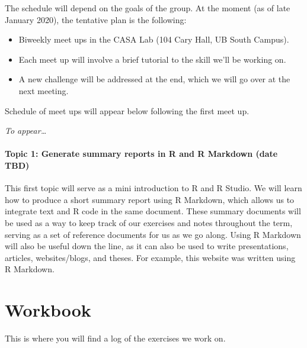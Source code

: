 \documentclass[
]{book}
\providecommand{\tightlist}{%
  \setlength{\itemsep}{0pt}\setlength{\parskip}{0pt}}
\begin{document}
The schedule will depend on the goals of the group. At the moment (as of late January 2020), the tentative plan is the following:

\begin{itemize}
\tightlist
\item
  Biweekly meet ups in the CASA Lab (104 Cary Hall, UB South Campus).
\item
  Each meet up will involve a brief tutorial to the skill we'll be working on.
\item
  A new challenge will be addressed at the end, which we will go over at the next meeting.
\end{itemize}

Schedule of meet ups will appear below following the first meet up.

\emph{To appear\ldots{}}

\hypertarget{topic-1-generate-summary-reports-in-r-and-r-markdown-date-tbd}{%
\subsubsection*{Topic 1: Generate summary reports in R and R Markdown (date TBD)}\label{topic-1-generate-summary-reports-in-r-and-r-markdown-date-tbd}}

This first topic will serve as a mini introduction to R and R Studio. We will learn how to produce a short summary report using R Markdown, which allows us to integrate text and R code in the same document. These summary documents will be used as a way to keep track of our exercises and notes throughout the term, serving as a set of reference documents for us as we go along. Using R Markdown will also be useful down the line, as it can also be used to write presentations, articles, websites/blogs, and theses. For example, this website was written using R Markdown.

\hypertarget{workbook}{%
\chapter{Workbook}\label{workbook}}

This is where you will find a log of the exercises we work on.

\backmatter
  
\end{document}
